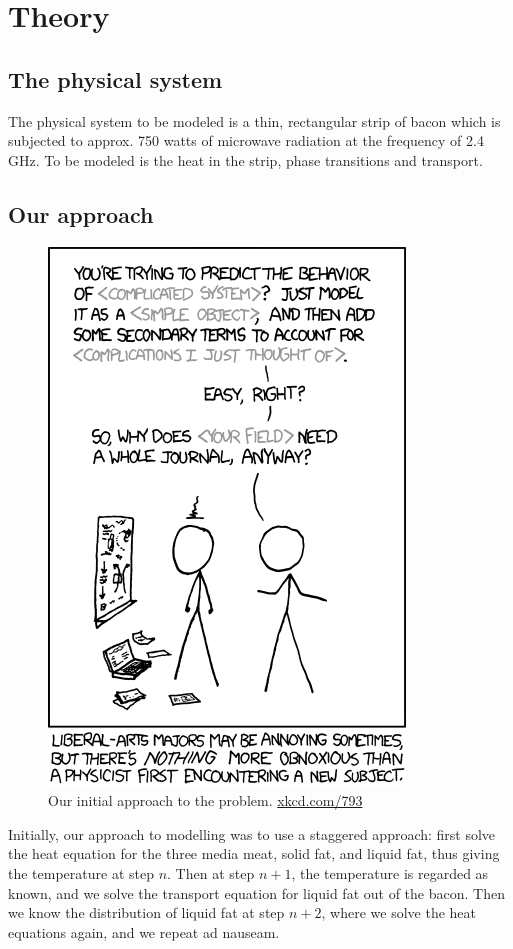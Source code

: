 \chapter{Theory}
\section{The physical system}
The physical system to be modeled is a thin, rectangular strip of bacon which is
subjected to approx. 750 watts of microwave radiation at the frequency of 2.4
GHz. To be modeled is the heat in the strip, phase transitions and transport.

\section{Our approach}
\begin{figure}[!h]
  \begin{center}
    \includegraphics[width=0.4\linewidth]{physicists.png}
  \end{center}
  \caption{Our initial approach to the problem. \url{xkcd.com/793}}
  \label{fig:xkcd_physics}
\end{figure}

Initially, our approach to modelling was to use a staggered approach: first solve the
heat equation for the three media meat, solid fat, and liquid fat, thus giving
the temperature at step $n$. Then at step $n+1$, the temperature is regarded as
known, and we solve the transport equation for liquid fat out of the bacon. Then
we know the distribution of liquid fat at step $n+2$, where we solve the heat
equations again, and we repeat ad nauseam.

